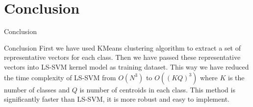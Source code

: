 \documentclass{beamer}
\begin{document}
\section{Conclusion}
\begin{frame}{Conclusion}
    \begin{block}{Conclusion}
    First we have used KMeans clustering algorithm to extract a set of representative vectors for each class.
    Then we have passed these representative vectors into LS-SVM kernel model as training dataset.
    This way we have reduced the time complexity of LS-SVM from $O(N^3)$ to $O((KQ)^3)$ where $K$ is the number of classes and $Q$ is number of centroids in each class.
    This method is significantly faster than LS-SVM, it is more robust and easy to implement.
    \end{block}
\end{frame}



\end{document}
